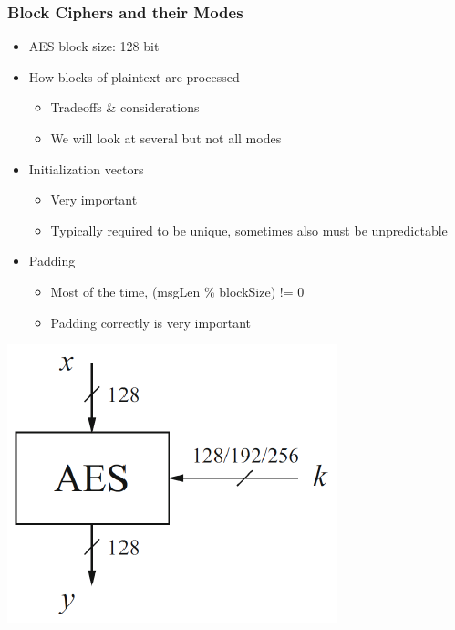 \subsubsection{Block Ciphers and their Modes}
\begin{minipage}{0.7\linewidth}
  \begin{itemize}
    \item AES block size: 128 bit
    \item How blocks of plaintext are processed
    \begin{itemize}
      \item Tradeoffs \& considerations
      \item We will look at several but not all modes
    \end{itemize}
    \item Initialization vectors
    \begin{itemize}
      \item Very important
      \item Typically required to be unique, sometimes also must be unpredictable
    \end{itemize}
    \item Padding
    \begin{itemize}
      \item Most of the time, (msgLen \% blockSize) != 0
      \item Padding correctly is very important
    \end{itemize}
  \end{itemize}
\end{minipage}
\begin{minipage}{0.3\linewidth}
  \includegraphics[width=\linewidth]{images/EmbeddedSecurity/aes}
\end{minipage}

